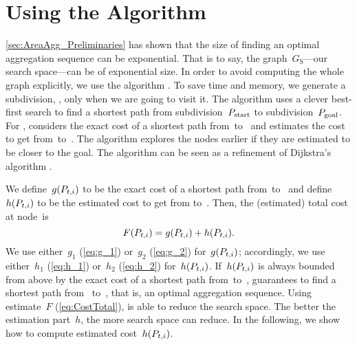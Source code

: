 \documentclass[acmsmall,natbib=false]{acmart}
\begin{document}
\section{Using the \texorpdfstring{\Astar Algorithm}{A* Algorithm}}
\label{sec:AreaAgg_AStar}

\sect\ref{sec:AreaAgg_Preliminaries} has shown that
the size of finding an optimal aggregation sequence 
can be exponential.
That is to say, the graph~$G_\mathrm{S}$---our search space---can 
be of exponential size.
In order to avoid computing the whole graph explicitly,
we use the \Astar algorithm \parencite{Hart1968,PatelAStar}.
To save time and memory, 
we generate a subdivision, \Pnode, only 
when we are going to visit it.
The \Astar algorithm uses a clever best-first search 
to find a shortest path 
from subdivision~$P_\mathrm{start}$ to subdivision~$P_\mathrm{goal}$.  
For \Pnode,
\Astar considers the exact cost of a shortest path 
from~\Pstart to~\Pnode 
and estimates the cost to get from~\Pnode to~\Pgoal. 
The \Astar algorithm explores the nodes earlier 
if they are estimated to be closer to the goal.
The \Astar algorithm can be seen as a refinement of Dijkstra's algorithm
\parencite{Dijkstra1959}.

We define~$g(P_{t,i})$ to be 
the exact cost of a shortest path from~\Pstart to~\Pnode 
and define~$h(P_{t,i})$ to be the estimated cost 
to get from \Pnode to~\Pgoal. 
Then, the (estimated) total cost at node~\Pnode is
\begin{equation}
\label{eq:CostTotal}
F(P_{t,i})=g(P_{t,i})+h(P_{t,i}).
\end{equation}
We use either~$g_1$ (\eq\ref{eq:g_1}) 
or~$g_2$ (\eq\ref{eq:g_2}) for~$g(P_{t,i})$;
accordingly, we use either~$h_1$ (\eq\ref{eq:h_1}) 
or~$h_2$ (\eq\ref{eq:h_2}) for~$h(P_{t,i})$.
If~$h(P_{t,i})$ is always bounded from above 
by the exact cost of a shortest path from~\Pnode to~\Pgoal, 
\Astar guarantees to find a shortest path from~\Pstart 
to~\Pgoal, 
that is, an optimal aggregation sequence.  
Using estimate~$F$ (\eq\ref{eq:CostTotal}), 
\Astar is able to reduce the search space.
The better the estimation part~$h$, 
the more search space \Astar can reduce.
In the following, we show how to compute
estimated cost~$h(P_{t,i})$.
\end{document}
